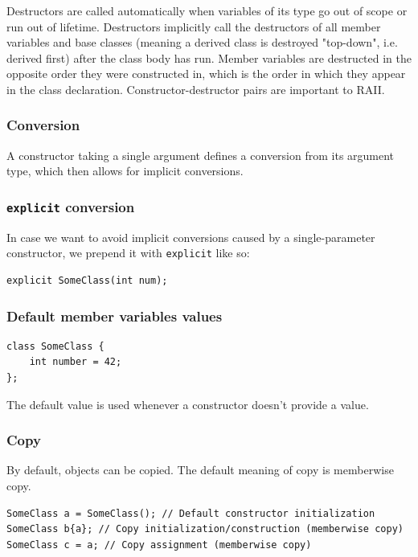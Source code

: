 \documentclass[table, xcdraw]{article}%
\begin{document}
Destructors are called automatically when variables of its type go out of scope or run out of lifetime. Destructors implicitly call the destructors of all member variables and base classes (meaning a derived class is destroyed "top-down", i.e. derived first) after the class body has run. Member variables are destructed in the opposite order they were constructed in, which is the order in which they appear in the class declaration. Constructor-destructor pairs are important to RAII.

\subsubsection{Conversion}

A constructor taking a single argument defines a conversion from its argument type, which then allows for implicit conversions.

\subsubsection{\texttt{explicit} conversion}

In case we want to avoid implicit conversions caused by a single-parameter constructor, we prepend it with \texttt{explicit} like so:

\begin{verbatim}
explicit SomeClass(int num);
\end{verbatim}

\subsubsection{Default member variables values}

\begin{verbatim}
class SomeClass {
    int number = 42;
};
\end{verbatim}

The default value is used whenever a constructor doesn’t provide a value.

\subsubsection{Copy}

By default, objects can be copied. The default meaning of copy is memberwise copy.

\begin{verbatim}
SomeClass a = SomeClass(); // Default constructor initialization
SomeClass b{a}; // Copy initialization/construction (memberwise copy)
SomeClass c = a; // Copy assignment (memberwise copy)
\end{verbatim}
\end{document}
